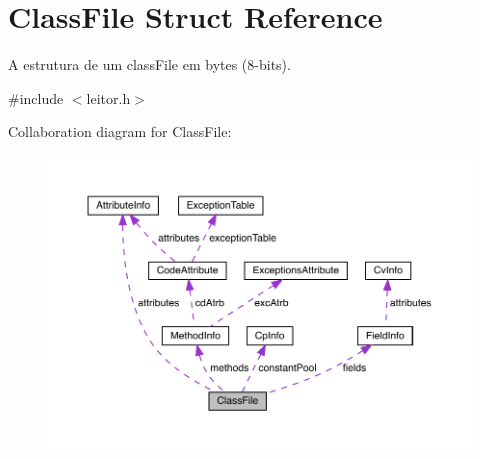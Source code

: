 \hypertarget{structClassFile}{}\section{Class\+File Struct Reference}
\label{structClassFile}


A estrutura de um class\+File em bytes (8-\/bits).  




{\ttfamily \#include $<$leitor.\+h$>$}



Collaboration diagram for Class\+File\+:
\nopagebreak
\begin{figure}[H]
\begin{center}
\leavevmode
\includegraphics[width=350pt]{structClassFile__coll__graph}
\end{center}
\end{figure}
